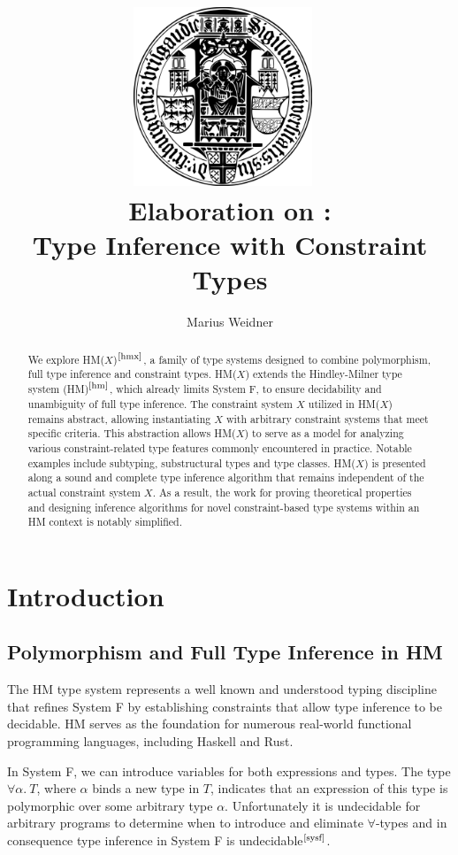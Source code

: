\documentclass[runningheads]{llncs}
\title{\includegraphics[width=0.4\textwidth]{logo.png}~\\[1cm] Elaboration on
  \hmx:\\Type Inference with Constraint Types}
\institute{Chair of Programming Languages, University of Freiburg \\
  \email{weidner@cs.uni-freiburg.de}}
\author{Marius Weidner}
\newcommand{\hmx}{HM($X$)}
\begin{document}
\let\oldaddcontentsline\addcontentsline{}
\def\addcontentsline#1#2#3{}
\maketitle
\def\addcontentsline#1#2#3{\oldaddcontentsline{#1}{#2}{#3}}

\begin{abstract}
  We explore \hmx{}$^\text{\cite{hmx}}$, a family of type systems designed to
  combine
  polymorphism, full type inference and constraint types.
  \hmx{} extends the Hindley-Milner type system (HM)$^\text{\cite{hm}}$, which
  already
  limits
  System F, to ensure decidability and unambiguity of full type inference.
  The constraint system $X$ utilized in \hmx{} remains abstract, allowing
  instantiating $X$ with arbitrary constraint systems that meet specific
  criteria.
  This abstraction allows \hmx{} to serve as a model for analyzing various
  constraint-related type features commonly encountered in practice.
  Notable examples include subtyping, substructural
  types and type classes.
  \hmx{} is presented along a sound and complete type inference algorithm that
  remains
  independent of the actual constraint system
  $X$.
  As a result, the work for proving theoretical properties and designing
  inference algorithms for novel constraint-based type systems within an
  HM context is notably simplified.
\end{abstract}

\setcounter{tocdepth}{2}
\tableofcontents
\newpage

\section{Introduction}

\subsection{Polymorphism and Full Type Inference in HM}
The HM type system represents a well known and understood typing discipline
that
refines System F by establishing constraints that allow type inference
to be decidable.
HM serves as the foundation for numerous real-world functional programming
languages, including Haskell and Rust.

In System F, we can introduce variables for both expressions and types.
The type $∀α. \ T$, where $α$ binds a new type in $T$,
indicates that an expression of this type is polymorphic over some
arbitrary type $α$.
Unfortunately it is undecidable for arbitrary programs to determine when to
introduce and eliminate $∀$-types and in consequence type inference in System F
is undecidable$^\text{\cite{sysf}}$.
\end{document}
